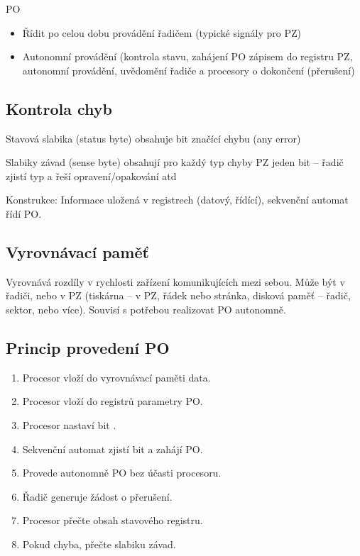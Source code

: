\documentclass[a4paper, 11pt]{report}
\begin{document}
PO
\begin{itemize}
	\item Řídit po celou dobu provádění řadičem (typické signály pro PZ)
	\item Autonomní provádění (kontrola stavu, zahájení PO zápisem do registru PZ, autonomní provádění, uvědomění řadiče a procesory o dokončení (přerušení)
\end{itemize}

\subsection{Kontrola chyb}
\begin{description}	
	\item Stavová slabika (status byte) obsahuje bit značící chybu (any error)
	\item Slabiky závad (sense byte) obsahují pro každý typ chyby PZ jeden bit -- řadič zjistí typ a řeší opravení/opakování atd
\end{description}

Konstrukce: Informace uložená v registrech (datový, řídící), sekvenční automat řídí PO.

\subsection{Vyrovnávací paměť}
Vyrovnává rozdíly v rychlosti zařízení komunikujících mezi sebou. Může být v řadiči, nebo v PZ (tiskárna -- v PZ, řádek nebo stránka, disková paměť -- řadič, sektor, nebo více). Souvisí s potřebou realizovat PO autonomně. 

\subsection{Princip provedení PO}
\begin{enumerate}
	\item Procesor vloží do vyrovnávací paměti data.
	\item Procesor vloží do registrů parametry PO.
	\item Procesor nastaví bit .
	\item Sekvenční automat zjistí bit  a zahájí PO.
	\item Provede autonomně PO bez účasti procesoru.
	\item Řadič generuje žádost o přerušení.
	\item Procesor přečte obsah stavového registru.
	\item Pokud chyba, přečte slabiku závad.
\end{enumerate}
\end{document}
